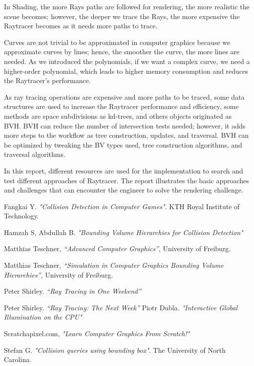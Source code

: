 \documentclass{article}
\begin{document}
	In Shading, the more Rays paths are followed for rendering, the more realistic the scene becomes; however, the deeper we trace the Rays, the more expensive the Raytracer becomes as it needs more paths to trace. 
	
	Curves are not trivial to be approximated in computer graphics because we approximate curves by lines; hence, the smoother the curve, the more lines are needed. As we introduced the polynomials, if we want a complex curve, we need a higher-order polynomial, which leads to higher memory consumption and reduces the Raytracer's performance. 
	
	As ray tracing operations are expensive and more paths to be traced, some data structures are used to increase the Raytracer performance and efficiency, some methods are space subdivisions as kd-trees, and others objects originated as BVH. BVH can reduce the number of intersection tests needed; however, it adds more steps to the workflow as tree construction, updates, and traversal.  BVH can be optimized by tweaking the BV types used, tree construction algorithms, and traversal algorithms.
	
	In this report, different resources are used for the implementation to search and test different approaches of Raytracer.  The report illustrates the basic approaches and challenges that can encounter the engineer to solve the rendering challenge. 
	
	
	\clearpage
	
	\begin{thebibliography}{9}
		Fangkai Y. 	\textit{"Collision Detection in Computer Games"}. KTH Royal Institute of Technology.
		
		Hamzah S, Abdullah B. 	\textit{"Bounding Volume Hierarchies for Collision Detection"}
		
		Matthias Teschner, 	\textit{“Advanced Computer Graphics”}, University of Freiburg.
		
		Matthias Teschner, 	\textit{“Simulation in Computer Graphics Bounding Volume Hierarchies”}, University of Freiburg.
		
		
		Peter Shirley. 	\textit{“Ray Tracing in One Weekend”}
		
		Peter Shirley. 	\textit{“Ray Tracing: The Next Week”}
		Piotr Dubla. 	\textit{"Interactive Global Illumination on the CPU"}
		
		Scratchapixel.com,	\textit{"Learn Computer Graphics From Scratch!"}
		
		
		Stefan G.	\textit{"Collision queries using bounding box"}. The University of North Carolina.
		
		
		
		
	\end{thebibliography}
	
	
\end{document}
